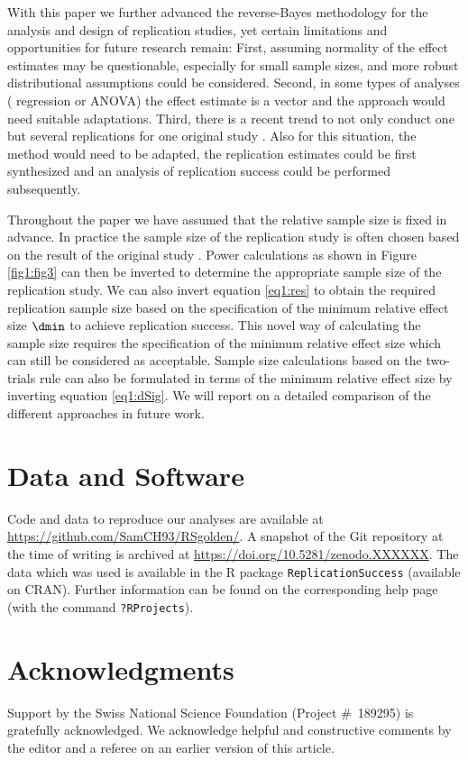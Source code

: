 With this paper we further advanced the reverse-Bayes methodology for the
analysis and design of replication studies, yet certain limitations and
opportunities for future research remain: First, assuming normality of the
effect estimates may be questionable, especially for small sample sizes, and
more robust distributional assumptions could be considered. Second, in some
types of analyses (\eg{} regression or ANOVA) the effect estimate is a vector and
the approach would need suitable adaptations. Third, there is a recent trend to
not only conduct one but several replications for one original study
\citep[\eg{}][]{Klein2014, Ebersole2016, Klein2018}. Also for this situation, the
method would need to be adapted, \eg{} the replication estimates could be first
synthesized and an analysis of replication success could be performed
subsequently.


Throughout the paper we have assumed that the relative sample size is fixed in
advance. In practice the sample size of the replication study is often chosen
based on the result of the original study \citep{Anderson2017}. Power
calculations as shown in Figure \ref{fig1:fig3} can then be inverted to determine
the appropriate sample size of the replication study. We can also invert
equation \eqref{eq1:res} to obtain the required replication sample size based on
the specification of the minimum relative effect size $\dmin$ to achieve
replication success. This novel way of calculating the sample size requires the
specification of the minimum relative effect size which can still be considered
as acceptable. Sample size calculations based on the two-trials rule can also be
formulated in terms of the minimum relative effect size by inverting equation
\eqref{eq1:dSig}. We will report on a detailed comparison of the different
approaches in future work.



\section*{Data and Software}
Code and data to reproduce our analyses are available at
\url{https://github.com/SamCH93/RSgolden/}. A snapshot of the Git repository at
the time of writing is archived at \url{https://doi.org/10.5281/zenodo.XXXXXX}.
The data which was used is available in the R package
\texttt{ReplicationSuccess} (available on CRAN). Further information can be
found on the corresponding help page (with the command \texttt{?RProjects}).

\section*{Acknowledgments}
Support by the Swiss National Science Foundation (Project \#~189295) is
gratefully acknowledged. We acknowledge helpful and constructive comments by the
editor and a referee on an earlier version of this article.




